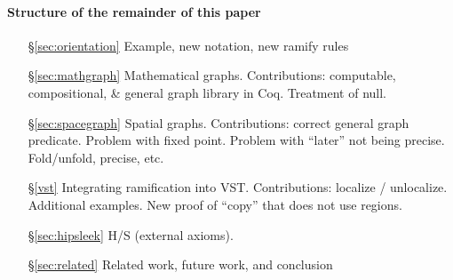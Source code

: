 \paragraph{Structure of the remainder of this paper}
\begin{itemize}
\item[\S\ref{sec:orientation}] Example, new notation, new ramify rules
\item[\S\ref{sec:mathgraph}] Mathematical graphs.  Contributions: computable, compositional, \& general graph library in Coq.  Treatment of null.
\item[\S\ref{sec:spacegraph}] Spatial graphs.  Contributions: correct general graph predicate.  Problem with fixed point.  Problem with ``later'' not being precise.  Fold/unfold, precise, etc.
\item[\S\ref{vst}] Integrating ramification into VST.  Contributions: localize / unlocalize.  Additional examples.  New proof of ``copy'' that does not use regions.
\item[\S\ref{sec:hipsleek}] H/S (external axioms).
\item[\S\ref{sec:related}] Related work, future work, and conclusion
\end{itemize}
